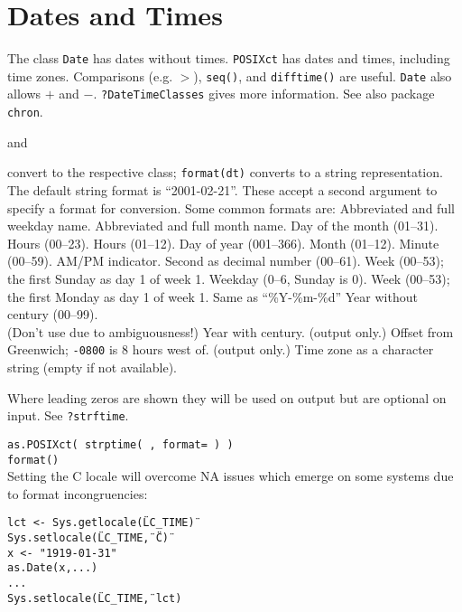 \section{Dates and Times}{
The class {\tt Date} has dates without times.  {\tt POSIXct} has
dates and times, including time zones. Comparisons (e.g. $>$),
{\tt seq()}, and {\tt difftime()} are useful. {\tt Date} also allows
$+$ and $-$. {\tt ?DateTimeClasses} gives more information. See also package
{\tt chron}.}

	{and}

	{convert to the respective class; {\tt format(dt)} converts to a string representation. The default string format is ``2001-02-21''. These accept a second argument to specify a format for conversion. Some common formats are:}
	{Abbreviated and full \\weekday name.}
	{Abbreviated and full month name.}
	{Day of the month (01--31).}
	{Hours (00--23).}
	{Hours (01--12).}
	{Day of year (001--366).}
	{Month (01--12).}
	{Minute (00--59).}
	{AM/PM indicator. }
	{Second as decimal number (00--61).}
	{Week (00--53); the first Sunday as day 1 of week 1.}
	{Weekday (0--6, Sunday is 0).}
	{Week (00--53); the first Monday as day 1 of week 1.}
	{Same as ``\%Y-\%m-\%d''}
	{Year without century (00--99).\\(Don't use due to ambiguousness!)}
	{Year with century.}
	{(output only.) Offset from Greenwich; {\tt -0800} is 8 hours west of.}
	{(output only.) Time zone as a character
    string (empty if not available).}

Where leading zeros are shown they will be used on output but are
optional on input. See {\tt ?strftime}.

{\tt as.POSIXct( strptime( , format= ) )\\
    format()}\\

Setting the C locale will overcome NA issues which emerge on some systems due
to format incongruencies:

{\tt lct <- Sys.getlocale(\"LC\_TIME\")\\
Sys.setlocale(\"LC\_TIME\", \"C\")\\
x <- "1919-01-31"\\
as.Date(x,...)\\
...\\
Sys.setlocale(\"LC\_TIME\", lct)
}

